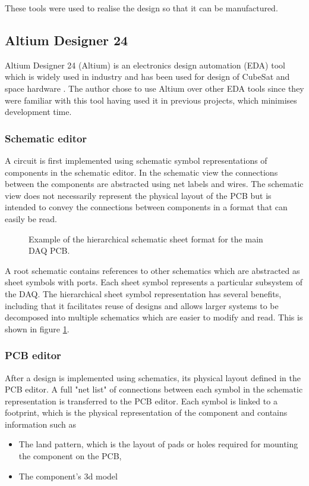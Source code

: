 \documentclass[]{report}
\begin{document}
These tools were used to realise the design so that it can be manufactured.

\subsection{Altium Designer 24}

Altium Designer 24 (Altium) is an electronics design automation (EDA) tool which is widely used in industry and has been used for design of CubeSat and space hardware \cite{10061409}.
The author chose to use Altium over other EDA tools since they were familiar with this tool having used it in previous projects, which minimises development time.

\subsubsection{Schematic editor}
\label{sec:schematic-editor}
A circuit is first implemented using schematic symbol representations of components in the schematic editor. In the schematic view the connections between the components are abstracted using net labels and wires. The schematic view does not necessarily represent the physical layout of the PCB but is intended to convey the connections between components in a format that can easily be read.

\begin{figure}[H]
  \centering
  
  \caption{Example of the hierarchical schematic sheet format for the main DAQ PCB.}
  \label{fig:altium-schematic-hierarchical}
\end{figure}

A root schematic contains references to other schematics which are abstracted as sheet symbols with ports. Each sheet symbol represents a particular subsystem of the DAQ. The hierarchical sheet symbol representation has several benefits, including that it facilitates reuse of designs and allows larger systems to be decomposed into multiple schematics which are easier to modify and read. This is shown in figure \ref{fig:altium-schematic-hierarchical}.

\subsubsection{PCB editor}
\label{sec:pcb-editor}
After a design is implemented using schematics, its physical layout defined in the PCB editor.
A full "net list" of connections between each symbol in the schematic representation is transferred to the PCB editor. Each symbol is linked to a footprint, which is the physical representation of the component and contains information such as
\begin{itemize}
  \item The land pattern, which is the layout of pads or holes required for mounting the component on the PCB,
  \item The component's 3d model
\end{itemize}
\end{document}
